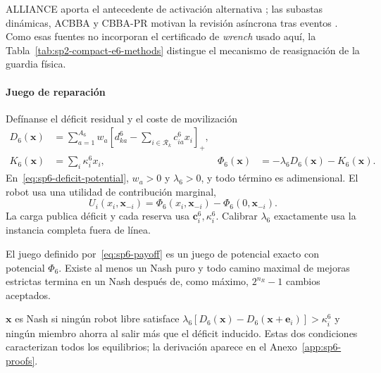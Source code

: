 ALLIANCE aporta el antecedente de activación alternativa \parencite{parker1998alliance}; las subastas dinámicas, ACBBA y CBBA-PR motivan la revisión asíncrona tras eventos \parencite{nanjanath2006dynamicAuctions,johnson2011acbba,buckman2019cbbaPr}. Como esas fuentes no incorporan el certificado de \emph{wrench} usado aquí, la Tabla~\ref{tab:sp2-compact-e6-methods} distingue el mecanismo de reasignación de la guardia física.


\paragraph{Juego de reparación}

Defínanse el déficit residual y el coste de movilización
\begin{equation}
\label{eq:sp6-deficit-potential}
\begin{aligned}
 D_6(\boldsymbol x)
 &=\sum_{a=1}^{A_6}w_a
 \left[d_{ka}^6-\sum_{i\in\mathcal R_k}c_{ia}^6x_i\right]_+,\\
 K_6(\boldsymbol x)&=\sum_i\kappa_i^6x_i,
 &\Phi_6(\boldsymbol x)&=-\lambda_6D_6(\boldsymbol x)-K_6(\boldsymbol x).
\end{aligned}
\end{equation}
En~\eqref{eq:sp6-deficit-potential}, $w_a>0$ y $\lambda_6>0$, y todo término es adimensional. El robot usa una utilidad de contribución marginal,
\begin{equation}
\label{eq:sp6-payoff}
 U_i(x_i,\boldsymbol x_{-i})=
 \Phi_6(x_i,\boldsymbol x_{-i})-\Phi_6(0,\boldsymbol x_{-i}).
\end{equation}
La carga publica déficit y cada reserva usa $\boldsymbol c_i^6,\kappa_i^6$. Calibrar $\lambda_6$ exactamente usa la instancia completa fuera de línea.

\begin{teorema}
\label{thm:sp6-exact-potential}
El juego definido por~\eqref{eq:sp6-payoff} es un juego de potencial exacto con potencial $\Phi_6$. Existe al menos un Nash puro y todo camino maximal de mejoras estrictas termina en un Nash después de, como máximo, $2^{n_R}-1$ cambios aceptados.
\end{teorema}

$\boldsymbol x$ es Nash si ningún robot libre satisface
$\lambda_6[D_6(\boldsymbol x)-D_6(\boldsymbol x+\boldsymbol e_i)]>\kappa_i^6$
y ningún miembro ahorra al salir más que el déficit inducido. Estas dos condiciones caracterizan todos los equilibrios; la derivación aparece en el Anexo~\ref{app:sp6-proofs}.

